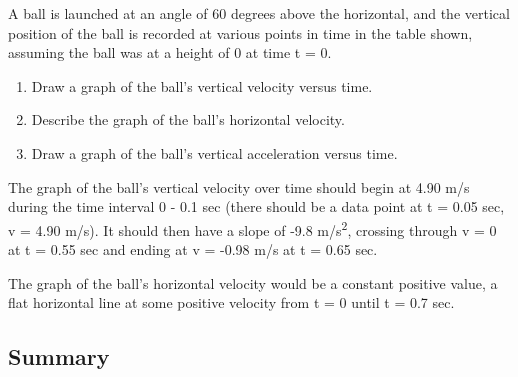 \documentclass[
]{book}
\providecommand{\tightlist}{%
  \setlength{\itemsep}{0pt}\setlength{\parskip}{0pt}}
\newenvironment{ap-test-prep}{}{}
\begin{document}
\begin{ap-test-prep}
A ball is launched at an angle of 60 degrees above the horizontal, and
the vertical position of the ball is recorded at various points in time
in the table shown, assuming the ball was at a height of 0 at time t =
0.

\begin{enumerate}
\def\labelenumi{\alph{enumi}.}
\tightlist
\item
  Draw a graph of the ball's vertical velocity versus time.
\item
  Describe the graph of the ball's horizontal velocity.
\item
  Draw a graph of the ball's vertical acceleration versus time.
\end{enumerate}

\leavevmode\hypertarget{fs-id1928435}{}%
The graph of the ball's vertical velocity over time should begin at
4.90 m/s during the time interval 0 - 0.1 sec (there should be a data
point at t = 0.05 sec, v = 4.90 m/s). It should then have a slope of
-9.8 m/s\textsuperscript{2}, crossing through v = 0 at t = 0.55 sec and ending at v =
-0.98 m/s at t = 0.65 sec.

The graph of the ball's horizontal velocity would be a constant
positive value, a flat horizontal line at some positive velocity from t
= 0 until t = 0.7 sec.

\end{ap-test-prep}

\hypertarget{fs-id1165298622440-summary}{}
\hypertarget{summary-1}{%
\subsection{Summary}\label{summary-1}}
\end{document}
